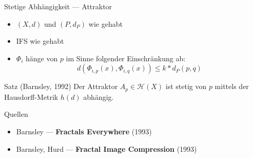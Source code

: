 \documentclass[10pt]{beamer}
\begin{document}
\begin{frame}{Stetige Abhängigkeit --- Attraktor}
  \begin{itemize}
    \item \( (X,d) \) und \( (P, d_P) \) wie gehabt
    \item IFS wie gehabt
    \item \( \Phi_i \) hänge von \( p \) im Sinne folgender Einschränkung ab:
    \begin{equation*}
      d(\Phi_{i,p}(x), \Phi_{i,q}(x)) \leq k * d_P(p,q)
    \end{equation*}
  \end{itemize}
  \begin{block}{Satz (Barnsley, 1992)}
    Der Attraktor \( A_p \in \mathcal{H}(X) \) ist stetig von \( p \) mittels der Hausdorff-Metrik \( h(d) \) abhängig.
  \end{block}
\end{frame}

\begin{frame}[fragile]{Quellen}
  \begin{itemize}
    \item Barnsley --- \textbf{Fractals Everywhere} (1993)
    \item Barnsley, Hurd --- \textbf{Fractal Image Compression} (1993)
  \end{itemize}
\end{frame}
\end{document}
